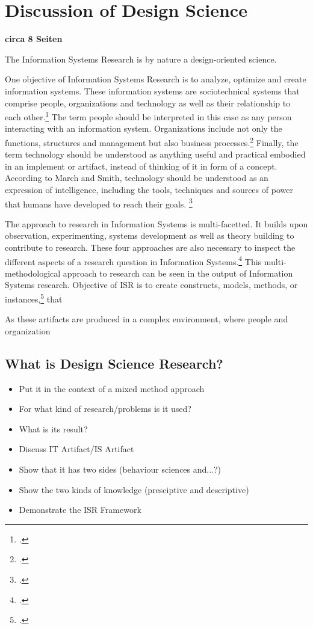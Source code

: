 \chapter{Discussion of Design Science}
\textbf{circa 8 Seiten}


The Information Systems Research is by nature a design-oriented science.

One objective of Information Systems Research is to analyze, optimize and create information systems. These information systems are sociotechnical systems that comprise people, organizations and technology as well as their relationship to each other.\footcites[Cf.][p.98]{HevnerDesignScienceResearch2004}[cf.][p.11]{OsterleGestaltungsorientierteWirtschaftsinformatikPladoyer2010} The term people should be interpreted in this case as any person interacting with an information system. Organizations include not only the functions, structures and management but also business processes.\footcite[Cf.][p.98]{HevnerDesignScienceResearch2004} Finally, the term technology should be understood as anything useful and practical embodied in an implement or artifact, instead of thinking of it in form of a concept. According to March and Smith, technology should be understood as an expression of intelligence, including the tools, techniques and sources of power that humans have developed to reach their goals. \footcite[Cf.][p.252]{MarchDesignnaturalscience1995} 

The approach to research in Information Systems is multi-facetted. It builds upon observation, experimenting, systems development as well as theory building to contribute to research. These four approaches are also necessary to inspect the different aspects of a research question in Information Systems.\footcite[Cf.][p.86]{NunamakerSystemsdevelopmentInformation1991} This multi-methodological approach to research can be seen in the output of Information Systems research. Objective of ISR is to create constructs, models, methods, or instances,\footcite[Cf.][p.12]{OsterleGestaltungsorientierteWirtschaftsinformatikPladoyer2010} that 

As these artifacts are produced in a complex environment, where people and organization

\section{What is Design Science Research?} 
\begin{itemize}
    \item Put it in the context of a mixed method approach
    \item For what kind of research/problems is it used?
    \item What is its result?
    \item Discuss IT Artifact/IS Artifact
    \item Show that it has two sides (behaviour sciences and...?)
    \item Show the two kinds of knowledge (presciptive and descriptive)
    \item Demonstrate the ISR Framework
\end{itemize}


